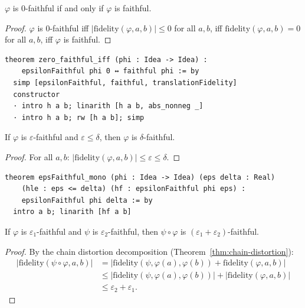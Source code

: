 \begin{theorem}
\label{thm:zero-faithful}
$\varphi$ is $0$-faithful if and only if $\varphi$ is faithful.
\end{theorem}

\begin{proof}
$\varphi$ is $0$-faithful iff $|\mathrm{fidelity}(\varphi, a, b)| \leq 0$
for all $a, b$, iff $\mathrm{fidelity}(\varphi, a, b) = 0$ for all $a, b$,
iff $\varphi$ is faithful.
\end{proof}

\begin{lstlisting}
theorem zero_faithful_iff (phi : Idea -> Idea) :
    epsilonFaithful phi 0 ↔ faithful phi := by
  simp [epsilonFaithful, faithful, translationFidelity]
  constructor
  · intro h a b; linarith [h a b, abs_nonneg _]
  · intro h a b; rw [h a b]; simp
\end{lstlisting}

\begin{theorem}
\label{thm:eps-faithful-mono}
If $\varphi$ is $\varepsilon$-faithful and $\varepsilon \leq \delta$, then
$\varphi$ is $\delta$-faithful.
\end{theorem}

\begin{proof}
For all $a, b$: $|\mathrm{fidelity}(\varphi, a, b)| \leq \varepsilon
\leq \delta$.
\end{proof}

\begin{lstlisting}
theorem epsFaithful_mono (phi : Idea -> Idea) (eps delta : Real)
    (hle : eps <= delta) (hf : epsilonFaithful phi eps) :
    epsilonFaithful phi delta := by
  intro a b; linarith [hf a b]
\end{lstlisting}

\begin{theorem}
\label{thm:eps-faithful-comp}
If $\varphi$ is $\varepsilon_1$-faithful and $\psi$ is $\varepsilon_2$-faithful,
then $\psi \circ \varphi$ is $(\varepsilon_1 + \varepsilon_2)$-faithful.
\end{theorem}

\begin{proof}
By the chain distortion decomposition (Theorem~\ref{thm:chain-distortion}):
\begin{align*}
  |\mathrm{fidelity}(\psi \circ \varphi, a, b)|
    &= |\mathrm{fidelity}(\psi, \varphi(a), \varphi(b))
       + \mathrm{fidelity}(\varphi, a, b)| \\
    &\leq |\mathrm{fidelity}(\psi, \varphi(a), \varphi(b))|
       + |\mathrm{fidelity}(\varphi, a, b)| \\
    &\leq \varepsilon_2 + \varepsilon_1.
\end{align*}
\end{proof}

